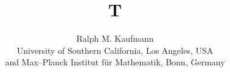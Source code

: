 \documentclass{amsart}
\begin{document}
\title{T}
\author{Ralph M. Kaufmann\\ University of Southern California, Los Angeles, USA\\ and Max--Planck Institut f\"ur Mathematik, Bonn, Germany}
\maketitle
\end{document}
